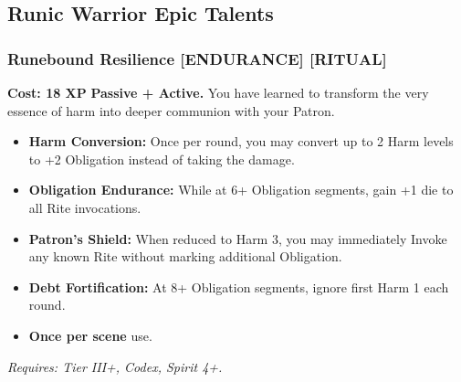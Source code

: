 \documentclass[12pt,a4paper]{book}
\begin{document}
\subsection*{Runic Warrior Epic Talents}
\label{sec:epic-runic-warrior}

\subsubsection*{Runebound Resilience \textnormal{[ENDURANCE] [RITUAL]}}
\label{talent:runebound-resilience}
\textbf{Cost: 18 XP} \textbf{Passive + Active.} You have learned to transform the very essence of harm into deeper communion with your Patron.
\begin{itemize}
\item \textbf{Harm Conversion:} Once per round, you may convert up to 2 Harm levels to +2 Obligation instead of taking the damage.
\item \textbf{Obligation Endurance:} While at 6+ Obligation segments, gain +1 die to all Rite invocations.
\item \textbf{Patron's Shield:} When reduced to Harm 3, you may immediately Invoke any known Rite without marking additional Obligation.
\item \textbf{Debt Fortification:} At 8+ Obligation segments, ignore first Harm 1 each round.
\item \textbf{Once per scene} use.
\end{itemize}
\textit{Requires: Tier III+, Codex, Spirit 4+.}
\end{document}
